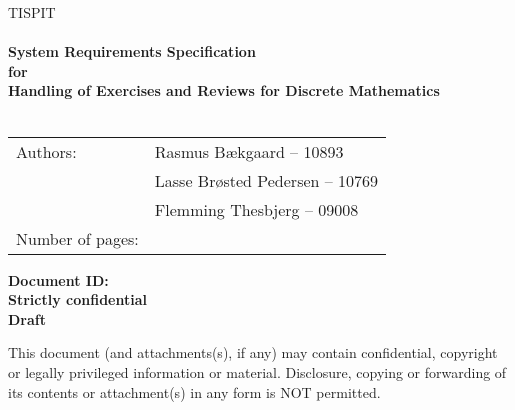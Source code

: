 \documentclass[Main]{subfiles}
\begin{document}
\begin{center}

\textsc{\Large TISPIT}\\[0.5cm]


\HRule \\[0.4cm]

{ \huge \bfseries System Requirements Specification}\\[0.4cm]
{ \huge \bfseries for}\\[0.4cm] 
{ \huge \bfseries Handling of Exercises and Reviews for Discrete Mathematics}\\[0.4cm]

\HRule \\[1.5cm]

\begin{tabular}{p{}|p{}}
\hline 
Authors: & Rasmus Bækgaard -- 10893\\ &Lasse Brøsted Pedersen -- 10769\\ &Flemming Thesbjerg -- 09008\\ 
\hline 
Number of pages: & \pageref{LastPage} \\
\hline 
\end{tabular} \vspace{40pt}

\textbf{\Large Document ID: \DocID}\\
\textbf{\Large Strictly confidential}\\
\textbf{\Large Draft}

This document (and attachments(s), if any) may contain confidential, copyright or legally privileged information or material.
Disclosure, copying or forwarding of its contents or attachment(s) in any form is NOT permitted.
\end{center}
\end{document}
